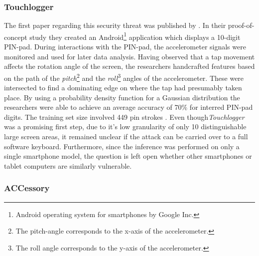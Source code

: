 \subsubsection{Touchlogger}

The first paper regarding this security threat was published by \citeauthor{Touchlogger}. In their proof-of-concept study they created an Android\footnote{Android operating system for smartphones by Google Inc.} application which displays a 10-digit PIN-pad. During interactions with the PIN-pad, the accelerometer signals were monitored and used for later data analysis. Having observed that a tap movement affects the rotation angle of the screen, the researchers handcrafted features based on the path of the \textit{pitch}\footnote{The pitch-angle corresponds to the x-axis of the accelerometer.} and the \textit{roll}\footnote{The roll angle corresponds to the y-axis of the accelerometer.} angles of the accelerometer. These were intersected to find a dominating edge on where the tap had presumably taken place. By using a probability density function for a Gaussian distribution the researchers were able to achieve an average accuracy of 70\% for interred PIN-pad digits. The training set size involved 449 pin strokes \cite{Touchlogger}. Even though\textit{Touchlogger} was a promising first step, due to it's low granularity of only 10 distinguishable large screen areas, it remained unclear if the attack can be carried over to a full software keyboard. Furthermore, since the inference was performed on only a single smartphone model, the question is left open whether other smartphones or tablet computers are similarly vulnerable.

\subsubsection{ACCessory}

